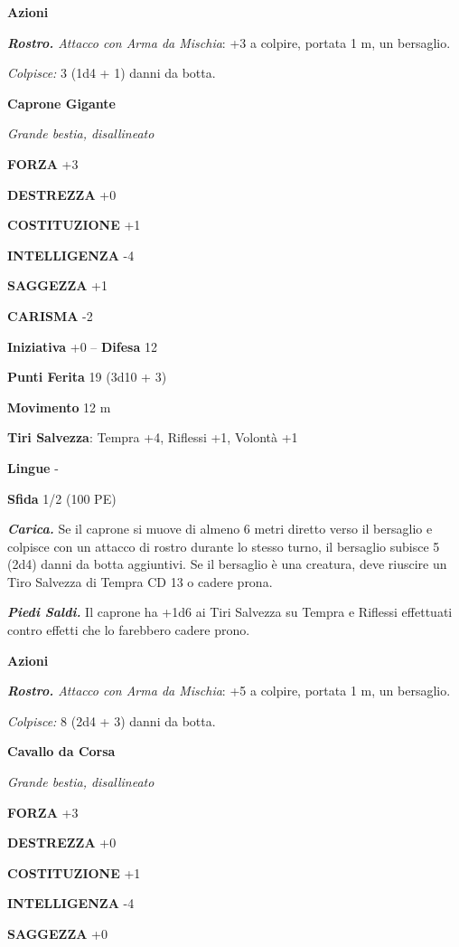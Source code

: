 \begin{multicols}{2}
\textbf{Azioni}

\emph{\textbf{Rostro.} Attacco con Arma da Mischia}: +3 a colpire, portata 1 m, un bersaglio.

\emph{Colpisce:} 3 (1d4 + 1) danni da botta.

\medskip\textbf{Caprone Gigante}

\emph{Grande bestia, disallineato}

\textbf{FORZA} +3

\textbf{DESTREZZA} +0

\textbf{COSTITUZIONE} +1

\textbf{INTELLIGENZA} -4

\textbf{SAGGEZZA} +1

\textbf{CARISMA} -2

\textbf{Iniziativa} +0 -- \textbf{Difesa} 12

\textbf{Punti Ferita} 19 (3d10 + 3)

\textbf{Movimento} 12 m

\textbf{Tiri Salvezza}: Tempra +4, Riflessi +1, Volontà +1 

\textbf{Lingue} -

\textbf{Sfida} 1/2 (100 PE)

\emph{\textbf{Carica.}} Se il caprone si muove di almeno 6 metri diretto verso il bersaglio e colpisce con un attacco di rostro durante lo stesso turno, il bersaglio subisce 5 (2d4) danni da botta aggiuntivi. Se il bersaglio è una creatura, deve riuscire un Tiro Salvezza di Tempra CD 13 o cadere prona.

\emph{\textbf{Piedi Saldi.}} Il caprone ha +1d6 ai Tiri Salvezza su Tempra e Riflessi effettuati contro effetti che lo farebbero cadere prono.

\textbf{Azioni}

\emph{\textbf{Rostro.} Attacco con Arma da Mischia}: +5 a colpire, portata 1 m, un bersaglio.

\emph{Colpisce:} 8 (2d4 + 3) danni da botta.

\medskip\textbf{Cavallo da Corsa}

\emph{Grande bestia, disallineato}

\textbf{FORZA} +3

\textbf{DESTREZZA} +0

\textbf{COSTITUZIONE} +1

\textbf{INTELLIGENZA} -4

\textbf{SAGGEZZA} +0


\end{multicols}
